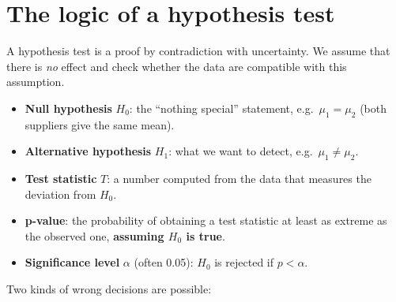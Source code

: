 \documentclass[
  letterpaper,
  DIV=11,
  numbers=noendperiod]{scrreprt}
\providecommand{\tightlist}{%
  \setlength{\itemsep}{0pt}\setlength{\parskip}{0pt}}\usepackage{longtable,booktabs,array}
\begin{document}
\section{The logic of a hypothesis
test}\label{the-logic-of-a-hypothesis-test}

A hypothesis test is a proof by contradiction with uncertainty. We
assume that there is \emph{no} effect and check whether the data are
compatible with this assumption.

\begin{tcolorbox}[enhanced jigsaw, left=2mm, title=\textcolor{quarto-callout-note-color}{\faInfo}\hspace{0.5em}{Definition: Elements of a hypothesis test}, opacityback=0, breakable, rightrule=.15mm, arc=.35mm, toptitle=1mm, colbacktitle=quarto-callout-note-color!10!white, opacitybacktitle=0.6, coltitle=black, colframe=quarto-callout-note-color-frame, bottomrule=.15mm, leftrule=.75mm, bottomtitle=1mm, titlerule=0mm, toprule=.15mm, colback=white]

\begin{itemize}
\tightlist
\item
  \textbf{Null hypothesis} \(H_0\): the ``nothing special'' statement,
  e.g.~\(\mu_1 = \mu_2\) (both suppliers give the same mean).
\item
  \textbf{Alternative hypothesis} \(H_1\): what we want to detect,
  e.g.~\(\mu_1 \neq \mu_2\).
\item
  \textbf{Test statistic} \(T\): a number computed from the data that
  measures the deviation from \(H_0\).
\item
  \textbf{p-value}: the probability of obtaining a test statistic at
  least as extreme as the observed one, \textbf{assuming \(H_0\) is
  true}.
\item
  \textbf{Significance level} \(\alpha\) (often 0.05): \(H_0\) is
  rejected if \(p < \alpha\).
\end{itemize}

\end{tcolorbox}

Two kinds of wrong decisions are possible:
\end{document}
